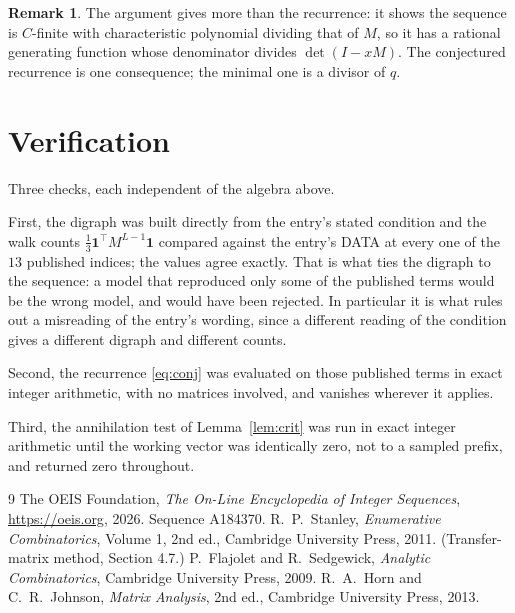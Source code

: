 \documentclass[11pt,a4paper]{article}
\theoremstyle{plain}
\theoremstyle{definition}
\newtheorem{remark}[theorem]{Remark}
\begin{document}
\begin{remark}
The argument gives more than the recurrence: it shows the sequence is $C$-finite with
characteristic polynomial dividing that of $M$, so it has a rational generating function
whose denominator divides $\det(I-xM)$. The conjectured recurrence is one consequence; the
minimal one is a divisor of $q$.
\end{remark}

\section{Verification}

Three checks, each independent of the algebra above.

First, the digraph was built directly from the entry's stated condition and the walk counts
$\tfrac1{3}\mathbf{1}^{\!\top}M^{L-1}\mathbf{1}$ compared against the entry's DATA at
every one of the $13$ published indices; the values agree exactly. That is what ties
the digraph to the sequence: a model that reproduced only some of the published terms would
be the wrong model, and would have been rejected. In particular it is what rules out a
misreading of the entry's wording, since a different reading of the condition gives a
different digraph and different counts.

Second, the recurrence \eqref{eq:conj} was evaluated on those published terms in exact
integer arithmetic, with no matrices involved, and vanishes wherever it applies.

Third, the annihilation test of Lemma~\ref{lem:crit} was run in exact integer arithmetic
until the working vector was identically zero, not to a sampled prefix, and returned zero
throughout.

\begin{thebibliography}{9}
 The OEIS Foundation, \emph{The On-Line Encyclopedia of Integer
Sequences}, \url{https://oeis.org}, 2026. Sequence A184370.
 R.~P.~Stanley, \emph{Enumerative Combinatorics}, Volume 1, 2nd ed.,
Cambridge University Press, 2011. (Transfer-matrix method, Section 4.7.)
 P.~Flajolet and R.~Sedgewick, \emph{Analytic Combinatorics}, Cambridge
University Press, 2009.
 R.~A.~Horn and C.~R.~Johnson, \emph{Matrix Analysis}, 2nd ed., Cambridge
University Press, 2013.
\end{thebibliography}
\end{document}
